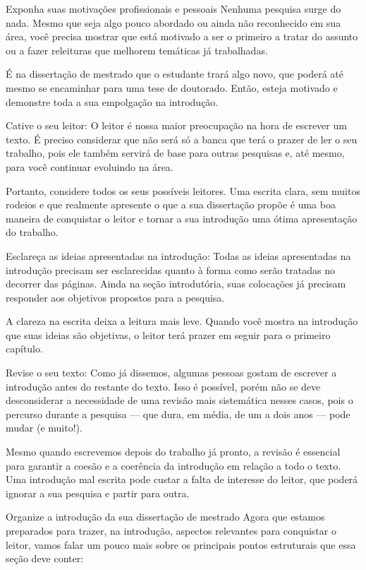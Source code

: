 Exponha suas motivações profissionais e pessoais
Nenhuma pesquisa surge do nada. Mesmo que seja algo pouco abordado ou ainda não reconhecido em sua área, você precisa mostrar que está motivado a ser o primeiro a tratar do assunto ou a fazer releituras que melhorem temáticas já trabalhadas.

É na dissertação de mestrado que o estudante trará algo novo, que poderá até mesmo se encaminhar para uma tese de doutorado. Então, esteja motivado e demonstre toda a sua empolgação na introdução.

Cative o seu leitor: O leitor é nossa maior preocupação na hora de escrever um texto. É preciso considerar que não será só a banca que terá o prazer de ler o seu trabalho, pois ele também servirá de base para outras pesquisas e, até mesmo, para você continuar evoluindo na área.

Portanto, considere todos os seus possíveis leitores. Uma escrita clara, sem muitos rodeios e que realmente apresente o que a sua dissertação propõe é uma boa maneira de conquistar o leitor e tornar a sua introdução uma ótima apresentação do trabalho.

Esclareça as ideias apresentadas na introdução: Todas as ideias apresentadas na introdução precisam ser esclarecidas quanto à forma como serão tratadas no decorrer das páginas. Ainda na seção introdutória, suas colocações já precisam responder aos objetivos propostos para a pesquisa.

A clareza na escrita deixa a leitura mais leve. Quando você mostra na introdução que suas ideias são objetivas, o leitor terá prazer em seguir para o primeiro capítulo.

Revise o seu texto: Como já dissemos, algumas pessoas gostam de escrever a introdução antes do restante do texto. Isso é possível, porém não se deve desconsiderar a necessidade de uma revisão mais sistemática nesses casos, pois o percurso durante a pesquisa — que dura, em média, de um a dois anos — pode mudar (e muito!).

Mesmo quando escrevemos depois do trabalho já pronto, a revisão é essencial para garantir a coesão e a coerência da introdução em relação a todo o texto. Uma introdução mal escrita pode custar a falta de interesse do leitor, que poderá ignorar a sua pesquisa e partir para outra.

Organize a introdução da sua dissertação de mestrado
Agora que estamos preparados para trazer, na introdução, aspectos relevantes para conquistar o leitor, vamos falar um pouco mais sobre os principais pontos estruturais que essa seção deve conter:

